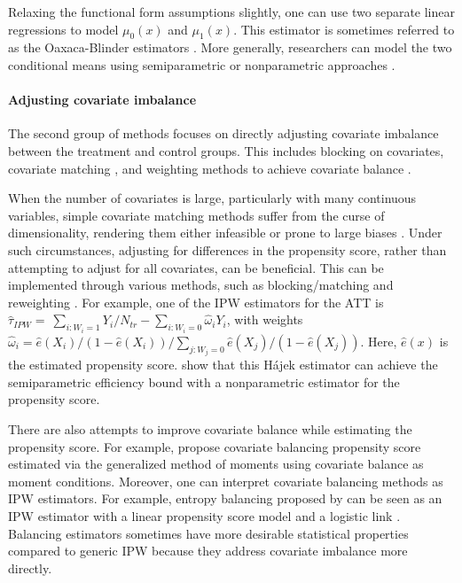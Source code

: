 \documentclass[letterpaper,12pt,leqno]{article}
\begin{document}
Relaxing the functional form assumptions slightly, one can use two separate linear regressions to model $\mu_{0}(x)$ and $\mu_{1}(x)$. This estimator is sometimes referred to as the Oaxaca-Blinder estimators \citep{kline2011oaxaca}. More generally, researchers can model the two conditional means using semiparametric or nonparametric approaches \citep[{\it e.g.},][]{heckman1997matching, heckman1998matching, athey2019generalized}.

\paragraph{Adjusting covariate imbalance} The second group of methods focuses on directly adjusting covariate imbalance between the treatment and control groups. This includes blocking on covariates, covariate matching \citep[e.g.,][]{abadie2006, abadie2008failure, abadie2011bias, abadie2016matching, diamond2013genetic, imbens2015}, and weighting methods to achieve covariate balance \citep[{\it e.g.},][]{hainmueller, zubizarreta2023handbook, zubizarreta2015stable}.

When the number of covariates is large, particularly with many continuous variables, simple covariate matching methods suffer from the curse of dimensionality, rendering them either infeasible or prone to large biases \citep{abadie2006}. Under such circumstances, adjusting for differences in the propensity score, rather than attempting to adjust for all covariates, can be beneficial. This can be implemented through various methods, such as blocking/matching \citep[{\it e.g.},][]{dehejiawahba} and reweighting \citep[{\it e.g.},][]{hirano2003efficient}. For example, one of the IPW estimators for the ATT is 
$\hat\tau_{IPW} = \ \sum_{i: W_{i} = 1}Y_{i}/N_{tr} - \sum_{i: W_{i} =  0}\hat\omega_i Y_{i}$, with weights
$\hat\omega_i=\hat{e}(X_{i})/(1 - \hat{e}(X_{i}))/\sum_{j: W_{j}=0}\hat{e}(X_{j})/(1 - \hat{e}(X_{j}))$. Here, $\hat{e}(x)$ is the estimated propensity score. \citet{hirano2003efficient} show that this Hájek estimator can achieve the semiparametric efficiency bound with a nonparametric estimator for the propensity score. 

There are also attempts to improve covariate balance while estimating the propensity score. For example, \citet{imai2014covariate} propose covariate balancing propensity score estimated via the generalized method of moments using covariate balance as moment conditions. Moreover, one can interpret covariate balancing methods as IPW estimators. For example, entropy balancing proposed by \citet{hainmueller} can be seen as an IPW estimator with a linear propensity score model and a logistic link \citep{zhao2016entropy}. Balancing estimators sometimes have more desirable statistical properties compared to generic IPW because they address covariate imbalance more directly. 
\end{document}

